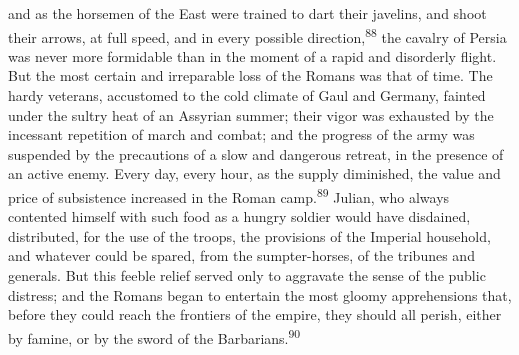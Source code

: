 and as the horsemen of the East were trained to dart their
javelins, and shoot their arrows, at full speed, and in every
possible direction,\textsuperscript{88} the cavalry of Persia was never more
formidable than in the moment of a rapid and disorderly flight.
But the most certain and irreparable loss of the Romans was that
of time. The hardy veterans, accustomed to the cold climate of
Gaul and Germany, fainted under the sultry heat of an Assyrian
summer; their vigor was exhausted by the incessant repetition of
march and combat; and the progress of the army was suspended by
the precautions of a slow and dangerous retreat, in the presence
of an active enemy. Every day, every hour, as the supply
diminished, the value and price of subsistence increased in the
Roman camp.\textsuperscript{89} Julian, who always contented himself with such
food as a hungry soldier would have disdained, distributed, for
the use of the troops, the provisions of the Imperial household,
and whatever could be spared, from the sumpter-horses, of the
tribunes and generals. But this feeble relief served only to
aggravate the sense of the public distress; and the Romans began
to entertain the most gloomy apprehensions that, before they
could reach the frontiers of the empire, they should all perish,
either by famine, or by the sword of the Barbarians.\textsuperscript{90}




